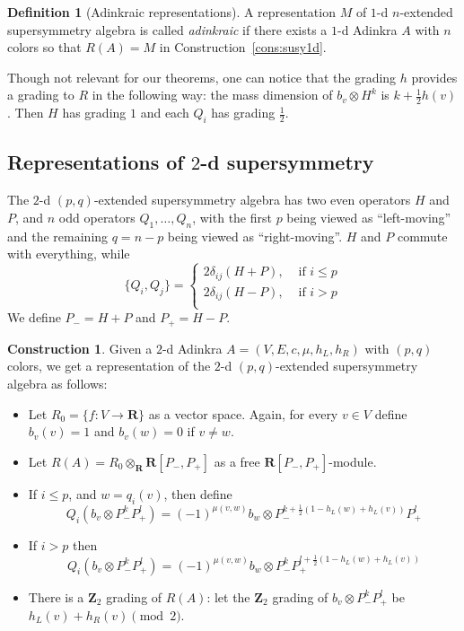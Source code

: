 \documentclass[12pt,twoside,singlespace]{article}
\numberwithin{equation}{section}
\theoremstyle{definition}
\newtheorem{definition}[equation]{Definition}
\newtheorem{construction}[equation]{Construction}
\newcommand{\ZZ}{\mathbf{Z}}
\newcommand{\RR}{\mathbf{R}}
\begin{document}
\begin{definition}[Adinkraic representations]
A representation $M$ of $1$-d $n$-extended supersymmetry algebra is called \emph{adinkraic} if there exists a $1$-d Adinkra $A$ with $n$ colors so that $R(A)=M$ in Construction~\ref{cons:susy1d}.
\end{definition}

Though not relevant for our theorems, one can notice that the grading $h$ provides a grading to $R$ in the following way: the mass dimension of $b_v\otimes H^k$ is $k+\frac12 h(v)$.  Then $H$ has grading $1$ and each $Q_i$ has grading $\frac12$.

\subsection{Representations of $2$-d supersymmetry}
The $2$-d $(p,q)$-extended supersymmetry algebra has two even operators $H$ and $P$, and $n$ odd operators $Q_1,\ldots, Q_n$, with the first $p$ being viewed as ``left-moving'' and the remaining $q=n-p$ being viewed as ``right-moving''.  $H$ and $P$ commute with everything, while
\[
\{Q_i, Q_j\}=\begin{cases}
2\delta_{ij}(H+ P),&\mbox{ if $i\le p$}\\
2\delta_{ij}(H- P),&\mbox{ if $i> p$}\\
\end{cases}
\]
We define $P_- = H+ P$ and $P_+=H-P$.

\begin{construction}
Given a $2$-d Adinkra $A=(V,E,c,\mu,h_L,h_R)$ with $(p,q)$ colors, we get a representation of the $2$-d $(p,q)$-extended supersymmetry algebra as follows:
\begin{itemize}
\item Let $R_0=\{f:V\to\RR\}$ as a vector space.  Again, for every $v\in V$ define $b_v(v)=1$ and $b_v(w)=0$ if $v\not=w$.
\item Let $R(A)=R_0\otimes_\RR \RR[P_-,P_+]$ as a free $\RR[P_-,P_+]$-module.
\item If $i\le p$, and $w=q_i(v)$, then define
\[Q_i(b_v\otimes P_-^k P_+^l)=
(-1)^{\mu(v,w)}b_w\otimes P_-^{k+\frac12(1-h_L(w)+h_L(v))}P_+^l \]
\item If $i>p$ then
\[Q_i(b_v\otimes P_-^k P_+^l)=
(-1)^{\mu(v,w)}b_w\otimes P_-^k P_+^{l+\frac12(1-h_L(w)+h_L(v))} \]
\item There is a $\ZZ_2$ grading of $R(A)$: let the $\ZZ_2$ grading of $b_v\otimes P_-^k P_+^l$ be $h_L(v)+h_R(v)\pmod{2}$.
\end{itemize}
\end{construction}
\end{document}
